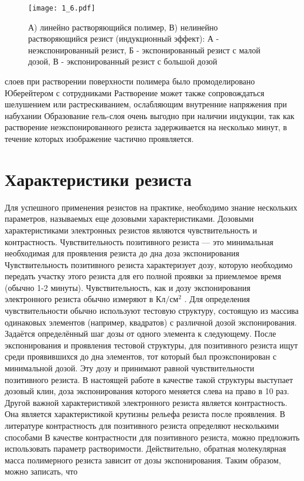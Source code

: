 \begin{figure}[H]
\center
\texttt{[image: 1\_6.pdf]}
\caption{А) линейно растворяющийся полимер, В) нелинейно растворяющийся резист (индукционный эффект): А - неэкспонированный резист, Б - экспонированный резист с малой дозой, В - экспонированный резист с большой дозой}
\label{fig:6}
\end{figure}

слоев при растворении поверхности полимера было промоделировано Юберейтером с сотрудниками Растворение может также сопровождаться шелушением или растрескиванием, ослабляющим внутренние напряжения при набухании Образование гель-слоя очень выгодно при наличии индукции, так как растворение неэкспонированного резиста задерживается на несколько минут, в течение которых изображение частично проявляется.

\section{Характеристики резиста}

Для успешного применения резистов на практике, необходимо знание нескольких параметров, называемых еще дозовыми характеристиками. Дозовыми характеристиками электронных резистов являются чувствительность и контрастность. Чувствительность позитивного резиста — это минимальная необходимая для проявления резиста до дна доза экспонирования Чувствительность позитивного резиста характеризует дозу, которую необходимо передать участку этого резиста для его полной проявки за приемлемое время (обычно 1-2 минуты). Чувствительность, как и дозу экспонирования электронного резиста обычно измеряют в $\text{Кл}/\text{см}^2$ . Для
определения чувствительности обычно используют тестовую структуру, состоящую из массива одинаковых элементов (например, квадратов) с
различной дозой экспонирования. Задаётся определённый шаг дозы от одного элемента к следующему. После экспонирования и проявления тестовой структуры, для позитивного резиста ищут среди проявившихся до дна элементов, тот который был проэкспонирован с минимальной дозой. Эту дозу и принимают равной чувствительности позитивного резиста. В настоящей работе в качестве такой структуры выступает дозовый клин, доза экспонирования которого меняется слева на право в 10 раз.
Другой важной характеристикой электронного резиста является контрастность. Она является характеристикой крутизны рельефа резиста после проявления. В литературе контрастность для позитивного резиста определяют несколькими способами	В качестве контрастности для
позитивного резиста, можно предложить использовать параметр растворимости. Действительно, обратная молекулярная масса полимерного резиста зависит от дозы экспонирования. 
Таким образом, можно записать, что

